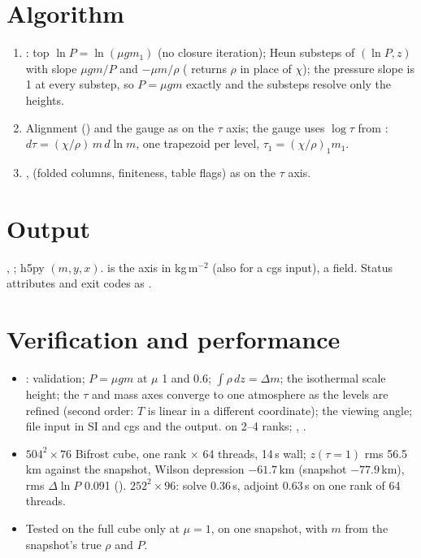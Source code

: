 \section{Algorithm}
\begin{enumerate}
\item {}: top $\ln P=\ln(\mu g m_1)$ (no closure iteration); Heun substeps of
$(\ln P, z)$ with slope $\mu g m/P$ and $-\mu m/\rho$ ( returns $\rho$ in place of $\chi$); the pressure slope is 1 at
every substep, so $P=\mu gm$ exactly and the substeps resolve only the heights.
\item Alignment () and the gauge as on the $\tau$ axis; the gauge uses $\log\tau$ from :
$d\tau=(\chi/\rho)\,m\,d\ln m$, one trapezoid per level, $\tau_1=(\chi/\rho)_1m_1$.
\item {},  (folded columns, finiteness, table flags) as on the $\tau$ axis.
\end{enumerate}

\section{Output}
, ; h5py $(m,y,x)$.
 is the axis in kg\,m$^{-2}$ (also for a cgs input),  a field. Status attributes and exit codes as
.



\adjointcolumntrue


\section{Verification and performance}
\begin{itemize}
\item {}: validation; $P=\mu gm$ at $\mu$ 1 and 0.6; $\int\rho\,dz=\Delta m$; the isothermal scale height; the $\tau$
and mass axes converge to one atmosphere as the levels are refined (second order: $T$ is linear in a different coordinate); the
viewing angle; file input in SI and cgs and the output.  on 2--4 ranks; ,
.
\item $504^2\times76$ Bifrost cube, one rank $\times$ 64 threads, 14\,s wall; $z(\tau{=}1)$ rms 56.5\,km against the snapshot, Wilson
depression $-61.7$\,km (snapshot $-77.9$\,km), rms $\Delta\ln P$ 0.091 (). $252^2\times96$: solve
0.36\,s, adjoint 0.63\,s on one rank of 64 threads.
\item Tested on the full cube only at $\mu=1$, on one snapshot, with $m$ from the snapshot's true $\rho$ and $P$.
\end{itemize}

